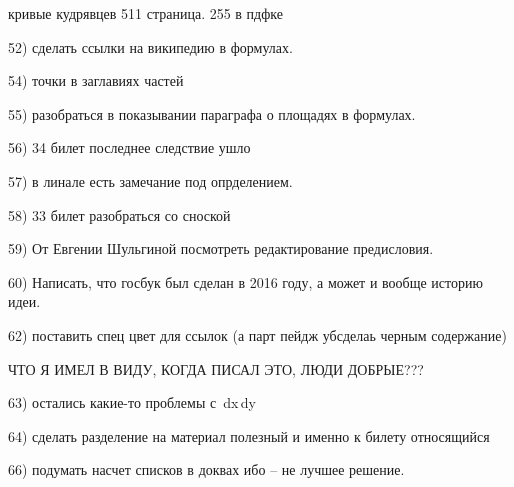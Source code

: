 кривые кудрявцев 511 страница. 255 в пдфке

52) сделать ссылки на википедию в формулах.

54) точки в заглавиях частей

55) разобраться в показывании параграфа о площадях в формулах.

56) 34 билет последнее следствие ушло

57) в линале есть замечание под опрделением.

58) 33 билет разобраться со сноской

59) От Евгении Шульгиной посмотреть редактирование предисловия.

60) Написать, что госбук был сделан в 2016 году, а может и вообще историю идеи. 

62) поставить спец цвет для ссылок (а парт пейдж убсделаь черным содержание)

ЧТО Я ИМЕЛ В ВИДУ, КОГДА ПИСАЛ ЭТО, ЛЮДИ ДОБРЫЕ??? ^^^

63) остались какие-то проблемы с \,dx\,dy

64) сделать разделение на материал полезный и именно к билету относящийся

66) подумать насчет списков в доквах ибо  -- не лучшее решение.
